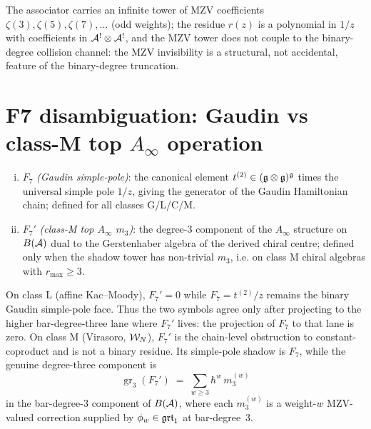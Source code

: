 \begin{remark}
The associator carries an infinite tower of MZV coefficients
$\zeta(3),\zeta(5),\zeta(7),\dots$ (odd weights); the residue
$r(z)$ is a polynomial in $1/z$ with coefficients in
$\mathcal{A}^{!}\otimes\mathcal{A}^{!}$, and the MZV tower does not couple to the
binary-degree collision channel: the MZV invisibility is a
structural, not accidental, feature of the binary-degree truncation.
\end{remark}

\section{F7 disambiguation: Gaudin vs class-M top $A_\infty$ operation}
\label{sec:f7-disambig}

\begin{definition}
\begin{enumerate}[(i)]
\item $F_7$ \emph{(Gaudin simple-pole)}: the canonical element
$t^{(2)}\in(\mathfrak{g}\otimes\mathfrak{g})^{\mathfrak{g}}$ times the universal simple pole
$1/z$, giving the generator of the Gaudin Hamiltonian chain; defined
for all classes G/L/C/M.
\item $F_7'$ \emph{(class-M top $A_\infty$ $m_3$)}: the degree-$3$
component of the $A_\infty$ structure on $B(\mathcal{A})$ dual to the
Gerstenhaber algebra of the derived chiral centre; defined only
when the shadow tower has non-trivial $m_3$, i.e. on class M
chiral algebras with $r_{\max}\geq 3$.
\end{enumerate}
\end{definition}

\begin{proposition}
On class L (affine Kac--Moody), $F_7' = 0$ while
$F_7=t^{(2)}/z$ remains the binary Gaudin simple-pole face. Thus the
two symbols agree only after projecting to the higher bar-degree-three
lane where $F_7'$ lives: the projection of $F_7$ to that lane is zero.
On class M (Virasoro, $\mathcal{W}_N$), $F_7'$ is the chain-level obstruction
to constant-coproduct and is not a binary residue. Its simple-pole
shadow is $F_7$, while the genuine degree-three component is
\[
 \operatorname{gr}_3(F_7')
 \;=\;
 \sum_{w\geq 3} \hbar^w\,m_3^{(w)}
\]
in the bar-degree-$3$ component of $B(\mathcal{A})$, where each
$m_3^{(w)}$ is a weight-$w$ MZV-valued correction supplied by
$\phi_w\in\mathfrak{grt}_1$ at bar-degree~$3$.
\end{proposition}


